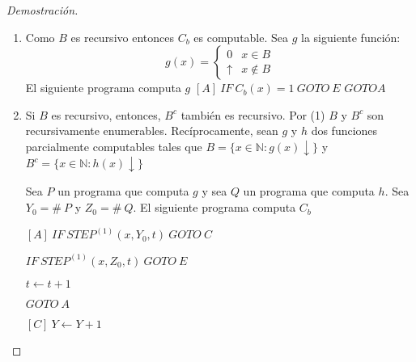 \begin{proof}[Demostraci\'on]
\hfill
\begin{enumerate}
	\item Como $B$ es recursivo entonces $C_b$ es computable. Sea $g$ la siguiente funci\'on:
	\[ g(x) =
		\begin{cases}
			0			&x \in B		\\
			\uparrow	&x \not \in B		
		\end{cases}
	\]
	El siguiente programa computa $g$
	$[A]\ IF \ C_b(x) = 1 \ GOTO \ E$	
	$GOTO A$
	\item Si $B$ es recursivo, entonces, $B^c$ tambi\'en es recursivo. Por (1) $B$ y $B^c$ son 			recursivamente enumerables.	 Rec\'iprocamente, sean $g$ y $h$ dos funciones parcialmente 			computables tales que $B = \{ x  \in \mathbb{N} \colon g(x) \downarrow \}$ y $B^c = \{ x \in 	\mathbb{N} \colon h(x) \downarrow \}$
	
	\noindent
	Sea $P$ un programa que computa $g$ y sea $Q$ un programa que computa $h$. Sea $Y_0 = \# \ P		$ y $Z_0 = \# \ Q$. El siguiente programa computa $C_b$
	
	$[A] \ IF \ STEP^{(1)}(x, Y_0, t) \ GOTO \ C$
	
	$IF \ STEP^{(1)}(x, Z_0, t) \ GOTO \ E$
	
	$t \leftarrow t + 1$
	
	$GOTO \ A$	
		
	$[C] \ Y \leftarrow Y + 1$
\end{enumerate}
\end{proof}
